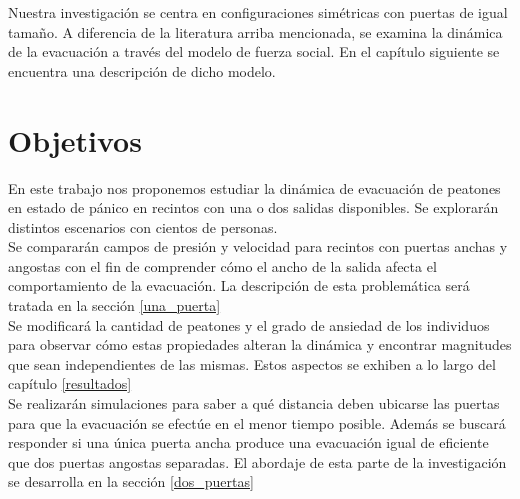 Nuestra investigación se centra en configuraciones simétricas con puertas de igual tamaño. A diferencia de la literatura arriba mencionada, se examina la dinámica de la evacuación a través del modelo de fuerza social. En el capítulo siguiente se encuentra una descripción de dicho modelo. \\

\newpage

\section{Objetivos}

En este trabajo nos proponemos estudiar la dinámica de evacuación de peatones en estado de pánico en recintos con una o dos salidas disponibles. Se explorarán distintos escenarios con cientos de personas.\\ 

Se compararán campos de presión y velocidad para recintos con puertas anchas y angostas con el fin de comprender cómo el ancho de la salida afecta el comportamiento de la evacuación. La descripción de esta problemática será tratada en la sección \ref{una_puerta}\\

Se modificará la cantidad de peatones y el grado de ansiedad de los individuos para observar cómo estas propiedades alteran la dinámica y encontrar magnitudes que sean independientes de las mismas. Estos aspectos se exhiben a lo largo del capítulo \ref{resultados} \\

Se realizarán simulaciones para saber a qué distancia deben ubicarse las puertas para que la evacuación se efectúe en el menor tiempo posible. Además se buscará responder si una única puerta ancha produce una evacuación igual de eficiente que dos puertas angostas separadas. El abordaje de esta parte de la investigación se desarrolla en la sección \ref{dos_puertas} 




